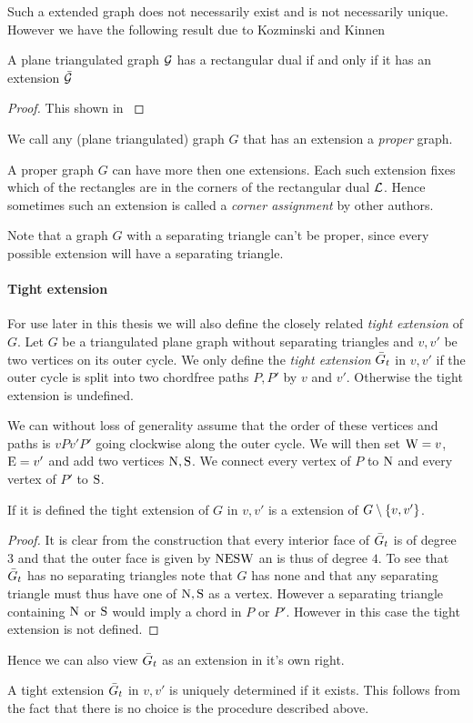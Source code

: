   Such a extended graph does not necessarily exist and is not necessarily unique.
  However we have the following result due to Kozminski and Kinnen

  \begin{thrm}
  A plane triangulated graph $\mathcal{G}$ has a rectangular dual if and only if it has an extension $\bar{\mathcal{G}}$
  \end{thrm}

  \begin{proof}
    This shown in \cite{Kozminski1984} 
  \end{proof}

  We call any (plane triangulated) graph $G$ that has an extension a \emph{proper} graph.

  A proper graph $G$ can have more then one extensions. Each such extension fixes which of the rectangles are in the corners of the rectangular dual $\mathcal{L}$. Hence sometimes such an extension is called a \emph{corner assignment} by other authors.

  Note that a graph $G$ with a separating triangle can't be proper, since every possible extension will have a separating triangle.

  \paragraph{Tight extension}
    For use later in this thesis we will also define the closely related \emph{tight extension} of $G$.
    Let $G$ be a triangulated plane graph without separating triangles and $v,v'$ be two vertices on its outer cycle.
    We only define the \emph{tight extension} $\bar{G}_t$ in $v, v'$ if the outer cycle is split into two chordfree paths $P, P'$ by $v$ and $v'$. Otherwise the tight extension is undefined.

    We can without loss of generality assume that the order of these vertices and paths is $v P v' P'$ going clockwise along the outer cycle. We will then set $\mathrm{W} = v$, $\mathrm{E} =v'$ and add two vertices $\mathrm{N}, \mathrm{S}$. We connect every vertex of $P$ to $\mathrm{N}$ and every vertex of $P'$ to $\mathrm{S}$.

    \begin{lemma}
      If it is defined the tight extension of $G$ in $v, v'$ is a extension of $G \setminus \left\lbrace {v, v'} \right\rbrace$.
    \end{lemma}
    \begin{proof}
      It is clear from the construction that every interior face of $\bar{G}_t$ is of degree 3 and that the outer face is given by $\mathrm{N} \mathrm{E} \mathrm{S} \mathrm{W}$ an is thus of degree $4$.
      To see that $\bar{G}_t$ has no separating triangles note that $G$ has none and that any separating triangle must thus have one of $\mathrm{N}, \mathrm{S}$ as a vertex. However a separating triangle containing $\mathrm{N}$ or $\mathrm{S}$ would imply a chord in $P$ or $P'$. However in this case the tight extension is not defined.
    \end{proof}
    Hence we can also view $\bar{G}_t$ as an extension in it's own right.

    A tight extension $\bar{G}_t$ in $v , v'$ is uniquely determined if it exists. This follows from the fact that there is no choice is the procedure described above.
